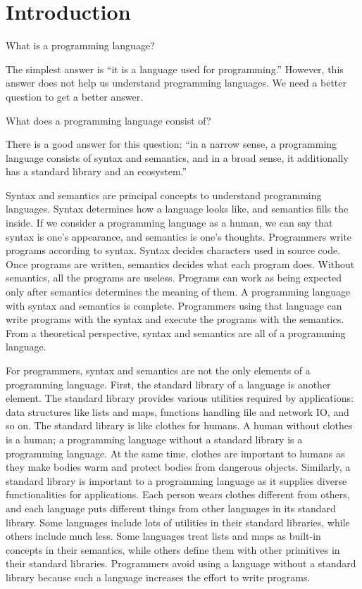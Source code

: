 \setchapterpreamble[u]{\margintoc}
\chapter{Introduction}

What is a programming language?

The simplest answer is ``it is a language used for programming.'' However, this
answer does not help us understand programming languages. We need a better
question to get a better answer.

What does a programming language consist of?

There is a good answer for this question: ``in a narrow sense, a programming
language consists of syntax and semantics, and in a broad sense, it additionally
has a standard library and an ecosystem.''

Syntax and semantics are principal concepts to understand programming languages.
Syntax determines how a language looks like, and semantics fills the inside. If
we consider a programming language as a human, we can say that syntax is one’s
appearance, and semantics is one’s thoughts. Programmers write programs
according to syntax. Syntax decides characters used in source code. Once programs
are written, semantics decides what each program does. Without semantics, all
the programs are useless. Programs can work as being expected only after
semantics determines the meaning of them. A programming language with syntax and
semantics is complete. Programmers using that language can write programs with
the syntax and execute the programs with the semantics. From a theoretical
perspective, syntax and semantics are all of a programming language.

For programmers, syntax and semantics are not the only elements of a programming
language. First, the standard library of a language is another element. The
standard library provides various utilities required by applications: data
structures like lists and maps, functions handling file and network IO, and so
on. The standard library is like clothes for humans. A human without clothes is
a human; a programming language without a standard library is a programming
language. At the same time, clothes are important to humans as they make bodies
warm and protect bodies from dangerous objects. Similarly, a standard library is
important to a programming language as it supplies diverse functionalities for
applications. Each person wears clothes different from others, and each language
puts different things from other languages in its standard library. Some
languages include lots of utilities in their standard libraries, while others
include much less. Some languages treat lists and maps as built-in concepts in
their semantics, while others define them with other primitives in their standard libraries.
Programmers avoid using a language without a standard library because such a
language increases the effort to write programs.

